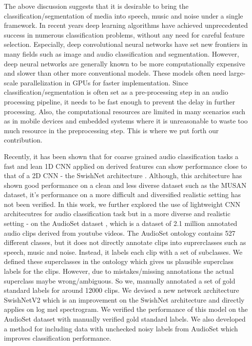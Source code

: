 \documentclass{article}
\begin{document}
The above discussion suggests that it is desirable to bring the classification/segmentation of media into speech, music and noise under a single framework. In recent years deep learning \cite{LeCun2015} algorithms have achieved unprecedented success in numerous classification problems, without any need for careful feature selection. Especially, deep convolutional neural networks have set new frontiers in many fields such as image and audio classification and segmentation. However, deep neural networks are generally known to be more computationally expensive and slower than other more conventional models. These models often need large-scale parallelization in GPUs for faster implementation. Since classification/segmentation is often set as a pre-processing step in an audio processing pipeline, it needs to be fast enough to prevent the delay in further processing. Also, the computational resources are limited in many scenarios such as in mobile devices and embedded systems where it is unreasonable to waste too much resource in the preprocessing step. This is where we put forth our contribution.

Recently, it has been shown that for coarse grained audio classification tasks a fast and lean 1D CNN applied on derived features can show performance close to that of a 2D CNN - the SwishNet architecture \cite{hussain2018swishnet}. Although, this architecture has shown good performance on a clean and less diverse dataset such as the MUSAN \cite{Snyder2015} dataset, it's performance on a more difficult and diversified realistic setting has not been verified. In this work, we further explored the use of lightweight CNN architecutres for audio classification task but in a more diverse and realistic setting - on the AudioSet dataset \cite{gemmeke2017audio}, which is a dataset of 2.1 million annotated audio clips derived from youtube videos. The AudioSet ontology contains 527 different classes, but it does not directly annotate clips into suprerclasses such as speech, music and noise. Instead, it labels each clip with a set of subclasses. We defined these superclasses in the ontology which gives us plausible superclass labels for the clips. However, due to mistakes/missing annotations the actual superclass maybe wrong/ambiguous. So we, manually annotated a set of gold standard labels for around 12000 clips. We devised a new network architecture SwishNetV2 which is an improvement on the SwishNet architecture and directly applies on log mel spectrogram. We verified the performance of this model on the AudioSet dataset with manually verified gold standard labels. We also developed a method for including data with unchecked noisy labels from AudioSet which improves classification performance.
\end{document}
